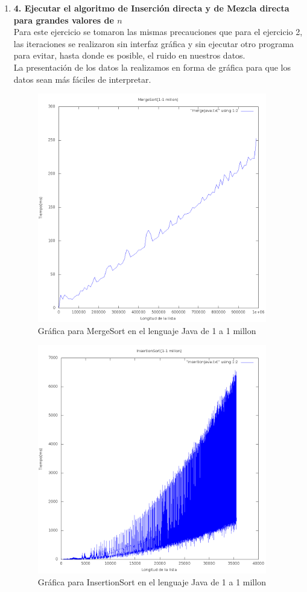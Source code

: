 \documentclass[11 pt, a4paper]{article}
\theoremstyle{definition}
\begin{document}
\begin{enumerate}
\item \textbf{4. Ejecutar el algoritmo de Inserción directa y de Mezcla directa para grandes valores de $n$}\\
  Para este ejercicio se tomaron las mismas precauciones que para el ejercicio 2, las iteraciones se realizaron sin
  interfaz gráfica y sin ejecutar otro programa para evitar, hasta donde es posible, el ruido en nuestros datos.\\
  La presentación de los datos la realizamos en forma de gráfica para que los datos sean más fáciles de interpretar. 
   \begin{figure}[H]
         \centering
          \includegraphics[trim=0cm 0cm 0cm 0cm, width=10cm]{1-1mJava.png} 
          \caption{Gráfica para MergeSort en el lenguaje Java de 1 a 1 millon}
      \end{figure}
      
      
       \begin{figure}[H]
         \centering
          \includegraphics[trim=0cm 0cm 0cm 0cm, width=10cm]{1-1mIJava.png} 
          \caption{Gráfica para InsertionSort en el lenguaje Java de 1 a 1 millon}
      \end{figure}
      

\end{enumerate}
\end{document}
